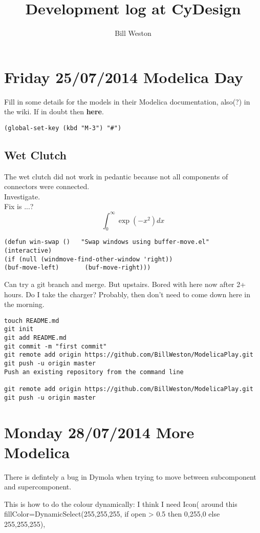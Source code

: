 \documentclass[11pt, oneside]{article}   	%
\title{Development log at CyDesign}
\author{Bill Weston}
\begin{document}
\maketitle
\section{Friday 25/07/2014  Modelica Day}

Fill in some details for the models in their Modelica documentation, also(?) in the wiki.
If in doubt then {\bf here}.

\verb+(global-set-key (kbd "M-3") "#")+
\subsection{Wet Clutch}
The wet clutch did not work in pedantic because not all components of connectors were connected.\\
Investigate.\\
Fix is ...?
$$ \int_0^{\infty}\exp(-x^2) dx $$

\begin{verbatim}
(defun win-swap ()   "Swap windows using buffer-move.el"   (interactive)     
(if (null (windmove-find-other-window 'right))         
(buf-move-left)       (buf-move-right)))
\end{verbatim}

Can try a git branch and merge.
But upstairs.  Bored with here now after 2+ hours.
Do I take the charger?  Probably, then don't need to come down here in the morning.
\begin{verbatim}
touch README.md
git init
git add README.md
git commit -m "first commit"
git remote add origin https://github.com/BillWeston/ModelicaPlay.git
git push -u origin master
Push an existing repository from the command line

git remote add origin https://github.com/BillWeston/ModelicaPlay.git
git push -u origin master
\end{verbatim}

\section{Monday 28/07/2014  More Modelica}

There is defintely a bug in Dymola when trying to move between
subcomponent and supercomponent.

This is how to do the colour dynamically:
I think I need Icon( around this
       fillColor=DynamicSelect({255,255,255}, if open > 0.5 then {0,255,0} else 
                    {255,255,255}),
\end{document}
